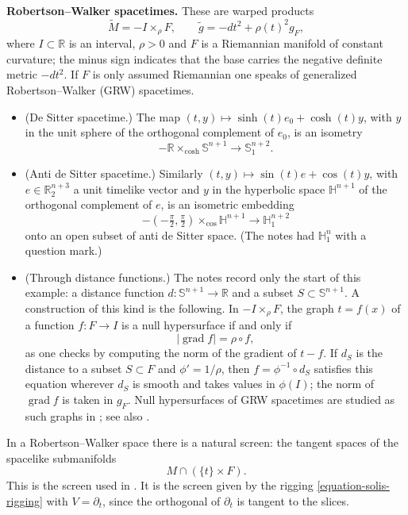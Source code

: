 \medskip\noindent
{\bf Robertson--Walker spacetimes.}
These are warped products
$$
\widetilde{M}=-I\times_{\rho}F,\qquad
\widetilde{g}=-dt^2+\rho(t)^2g_F,
$$
where $I\subset\mathbb{R}$ is an
interval, $\rho>0$ and $F$ is a
Riemannian manifold of constant
curvature; the minus sign indicates that
the base carries the negative definite
metric $-dt^2$. If $F$ is only assumed
Riemannian one speaks of generalized
Robertson--Walker (GRW) spacetimes.

\begin{example}
\label{example-solis-rw-space-forms}
\begin{itemize}
\item (De Sitter spacetime.) The map
$(t,y)\mapsto \sinh(t)e_0+\cosh(t)y$, with
$y$ in the unit sphere of the orthogonal
complement of $e_0$, is an isometry
$$
-\mathbb{R}\times_{\cosh}\mathbb{S}^{n+1}
\to\mathbb{S}^{n+2}_1.
$$
\item (Anti de Sitter spacetime.)
Similarly
$(t,y)\mapsto\sin(t)e+\cos(t)y$, with
$e\in\mathbb{R}^{n+3}_2$ a unit timelike
vector and $y$ in the hyperbolic space
$\mathbb{H}^{n+1}$ of the orthogonal
complement of $e$, is an isometric
embedding
$$
-\left(-\tfrac{\pi}{2},\tfrac{\pi}{2}
\right)\times_{\cos}\mathbb{H}^{n+1}
\to\mathbb{H}^{n+2}_1
$$
onto an open subset of anti de Sitter
space. (The notes had
$\mathbb{H}^n_1$ with a question mark.)
\item (Through distance functions.) The
notes record only the start of this
example: a distance function
$d\colon\mathbb{S}^{n+1}\to\mathbb{R}$ and
a subset $S\subset\mathbb{S}^{n+1}$. A
construction of this kind is the
following. In $-I\times_{\rho}F$, the
graph $t=f(x)$ of a function
$f\colon F\to I$ is a null hypersurface
if and only if
$$
|\operatorname{grad}f|=\rho\circ f,
$$
as one checks by computing the norm of
the gradient of $t-f$. If $d_S$ is the
distance to a subset $S\subset F$ and
$\phi'=1/\rho$, then $f=\phi^{-1}\circ
d_S$ satisfies this equation wherever
$d_S$ is smooth and takes values in
$\phi(I)$; the norm of $\operatorname{grad}f$
is taken in $g_F$. Null hypersurfaces of
GRW spacetimes are studied as such graphs
in \cite{navarro2016null}; see also
\cite[Example 3.3]{navarro2020screen}.
\end{itemize}
\end{example}

\begin{remark}
\label{remark-solis-rw-screen}
In a Robertson--Walker space there is a
natural screen: the tangent spaces of the
spacelike submanifolds
$$
M\cap\left(\{t\}\times F\right).
$$
This is the screen used in
\cite[Example 3.3]{navarro2020screen}. It
is the screen given by the rigging
\eqref{equation-solis-rigging} with
$V=\partial_t$, since the orthogonal of
$\partial_t$ is tangent to the slices.
\end{remark}

